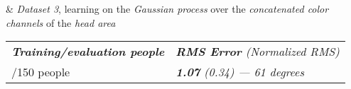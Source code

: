 \documentclass{beamer}
\newcommand{\myemph}[1]{{\it #1}}
\newcommand{\mybf}[1]{{\bf #1}}
\newcommand{\ghline}[0]{\arrayrulecolor[rgb]{0.635,0.635,0.635} \hline}
\newcommand{\tspace}{\rule{0pt}{2.6ex}}
\begin{document}
{\begin{block}{\centering \vspace*{3px}\myemph{Dataset 2} \& \myemph{Dataset 3}, learning on the \myemph{Gaussian process} over the \myemph{concatenated color channels} of the \myemph{head area}\vspace*{3px}}
	\begin{table}[htbp!]
		\begin{tabular}{l l}
			\myemph{\mybf{Training\slash evaluation people}} & \myemph{\mybf{RMS Error} (Normalized RMS)}\\[5pt]	
			\ghline
			864\slash 150 people\tspace & \myemph{\mybf{1.07} (0.34) --- 61 degrees}
		\end{tabular}
	\end{table}
	\end{block}
	\begin{block}{}
	\end{block}
	\transwipe
}
\end{document}
